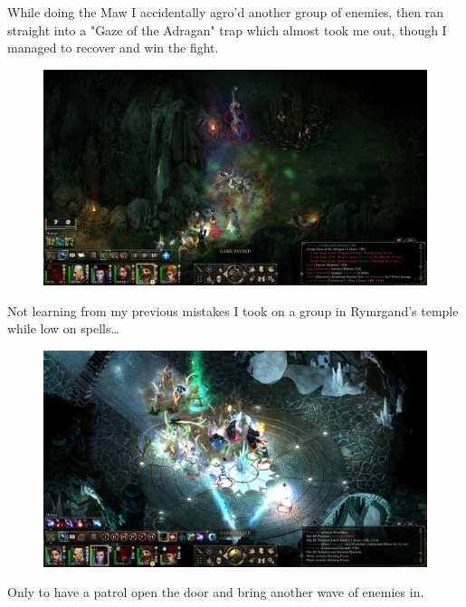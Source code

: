 \documentclass{article}
\begin{document}
While doing the Maw I accidentally agro'd another group of enemies, then ran straight into a "Gaze of the Adragan" trap which almost took me out, though I managed to recover and win the fight.

\begin{figure}
\includegraphics[scale=0.33]{files/blog/2019_03_04_pillars_of_eternity_path_of_the_damned_act_iii/2019_03_04_oldsong2.jpg}
\end{figure}

Not learning from my previous mistakes I took on a group in Rymrgand's temple while low on spells\ldots

\begin{figure}
\includegraphics[scale=0.33]{files/blog/2019_03_04_pillars_of_eternity_path_of_the_damned_act_iii/2019_03_04_oldsong3.jpg}
\end{figure}

Only to have a patrol open the door and bring another wave of enemies in.
\end{document}
